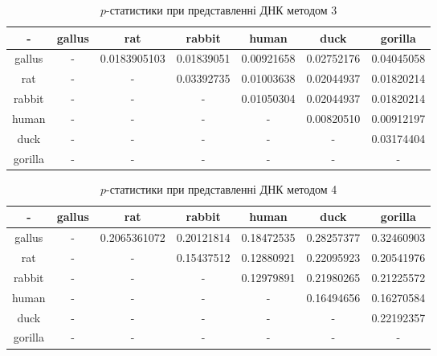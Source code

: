 \documentclass[14pt,a4paper,titlepage]{extarticle}
\begin{document}
\begin{table}[h!]
\begin{center}
\begin{tabular}{|c|c|c|c|c|c|c|}
\hline
- & gallus & rat & rabbit & human & duck & gorilla \\ \hline
gallus & - & 0.0183905103 & 0.01839051 & 0.00921658 & 0.02752176 & 0.04045058 \\ \hline
rat & - & - & 0.03392735 & 0.01003638 & 0.02044937 & 0.01820214 \\ \hline
rabbit & - & - & - & 0.01050304 & 0.02044937 & 0.01820214 \\ \hline
human & - & - & - & - & 0.00820510 & 0.00912197 \\ \hline
duck & - & - & - & - & - & 0.03174404 \\ \hline
gorilla & - & - & - & - & - & - \\ \hline
\end{tabular}
\end{center}
\caption{$p$-статистики при представленні ДНК методом 3}
\label{table:res3}
\end{table}

\begin{table}[h!]
\begin{center}
\begin{tabular}{|c|c|c|c|c|c|c|}
\hline
- & gallus & rat & rabbit & human & duck & gorilla \\ \hline
gallus & - & 0.2065361072 & 0.20121814 & 0.18472535 & 0.28257377 & 0.32460903 \\ \hline
rat & - & - & 0.15437512 & 0.12880921 & 0.22095923 & 0.20541976 \\ \hline
rabbit & - & - & - & 0.12979891 & 0.21980265 & 0.21225572 \\ \hline
human & - & - & - & - & 0.16494656 & 0.16270584 \\ \hline
duck & - & - & - & - & - & 0.22192357 \\ \hline
gorilla & - & - & - & - & - & - \\ \hline
\end{tabular}
\end{center}
\caption{$p$-статистики при представленні ДНК методом 4}
\label{table:res4}
\end{table}

\newpage
\end{document}
